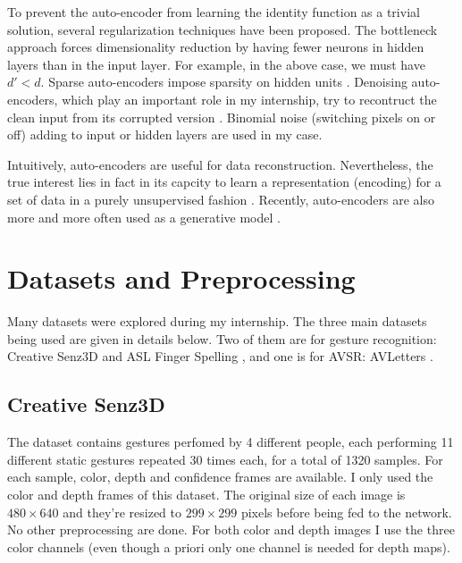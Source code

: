 To prevent the auto-encoder from learning the identity function as
a trivial solution, several regularization techniques have been proposed.
The bottleneck approach forces dimensionality reduction by having
fewer neurons in hidden layers than in the input layer. For example,
in the above case, we must have $d'<d$. Sparse auto-encoders impose sparsity
on hidden units \cite{A. Makhzani 2014}.
Denoising auto-encoders, which play an important role in my internship,
try to recontruct the clean input from its corrupted version
\cite{P. Vincent 2008, Y. Bengio 2012}. Binomial noise
(switching pixels on or off) adding
to input or hidden layers are used in my case.

Intuitively, auto-encoders are useful for data reconstruction.
Nevertheless, the true interest lies in fact in its capcity to learn
a representation (encoding) for a set of data in a purely unsupervised
fashion \cite{P. Vincent 2010}. Recently, auto-encoders are also
more and more often used as a generative model \cite{Y. Bengio 2013}.

\section{Datasets and Preprocessing} \label{section:dataset}

Many datasets were explored during my internship. The three main datasets
being used are given in details  below. Two of them are for gesture
recognition:
Creative Senz3D \cite{A. Memo 2015, A. Memo 2017} and ASL Finger Spelling
\cite{N. Pugeault 2011}, and one is for AVSR: AVLetters
\cite{I. Matthews 2002}.

\subsection{Creative Senz3D}

The dataset contains gestures perfomed by 4 different people, each
performing 11 different static gestures repeated 30 times each,
for a total of 1320 samples.
For each sample, color, depth and confidence frames are available.
I only used the color and depth frames of this dataset. The original
size of each image is $480 \times 640$ and they're resized to
$299 \times 299$ pixels before being fed to the network. No other
preprocessing are done. For both color and depth images I use the three
color channels (even though a priori only one channel is needed for
depth maps).

